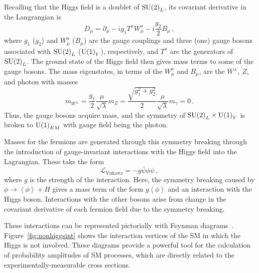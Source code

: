 Recalling that the Higgs field is a doublet of ${\rm SU(2)}_L$, its covariant derivative in the
Langrangian is
\begin{equation}
D_\mu = \partial_\mu - i g_1 T^a W^a_\mu - i \frac{g_2}{2} B_\mu \,,
\end{equation}
where $g_1$ ($g_2$) and $W^a_\mu$ ($B_\mu$) are the gauge couplings and three (one) gauge bosons
associated with ${\rm SU(2)}_L$ (${\rm U(1)}_Y$), respectively, and $T^a$ are the generators of
${\rm SU(2)}_L$. The ground state of the Higgs field then gives mass terms to some of the gauge bosons.
The mass eigenstates, in terms of the $W^a_\mu$ and $B_\mu$, are the $W^\pm$, $Z$, and photon with
masses
\begin{subequations}
\begin{equation}
m_{W^\pm} = \frac{g_1}{2}\frac{\mu}{\sqrt{\lambda}}
\end{equation}
\begin{equation}
m_Z = \frac{\sqrt{g_1^2+g_2^2}}{2}\frac{\mu}{\sqrt{\lambda}}
\end{equation}
\begin{equation}
m_\gamma = 0 \,.
\end{equation}
\end{subequations}
Thus, the gauge bosons acquire mass, and the symmetry of ${\rm SU(2)}_L \times {\rm U(1)}_Y$ is
broken to ${\rm U(1)}_{EM}$ with gauge field being the photon.  

Masses for the fermions are generated through this symmetry breaking through the introduction of
gauge-invariant interactions with the Higgs field into the Lagrangian. These take the form
\begin{equation}
\mathcal{L}_{\text{Yukawa}} = -g \bar{\psi}\phi\psi \,,
\end{equation}
where $g$ is the strength of the interaction. Here, the symmetry breaking caused by
$\phi \rightarrow \left\langle \phi \right\rangle + H$ gives a mass term of the form
$g \left\langle \phi \right\rangle$ and an interaction with the Higgs boson. Interactions with the
other bosons arise from change in the covariant derivative of each fermion field due to the
symmetry breaking.

These interactions can be represented pictorially with
Feynman diagrams~\cite{1948.Feynman.path-integral-QM}. Figure~\ref{fig:nonhiggsint} shows the
interaction vertices of the SM in which the Higgs is not involved. These diagrams provide a powerful
tool for the calculation of probability amplitudes of SM processes, which are directly related to the
experimentally-measurable cross sections.

